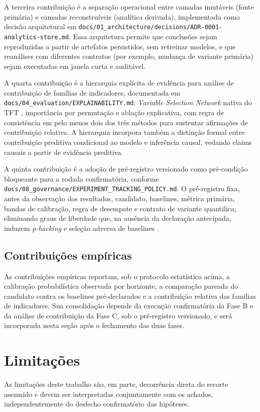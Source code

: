 A terceira contribuição é a separação operacional entre camadas imutáveis (fonte primária) e camadas reconstruíveis (analítica derivada), implementada como decisão arquitetural em \texttt{docs/01\_architecture/decisions/ADR-0001-analytics-store.md}. Essa arquitetura permite que conclusões sejam reproduzidas a partir de artefatos persistidos, sem retreinar modelos, e que reanálises com diferentes contratos (por exemplo, mudança de variante primária) sejam executadas em janela curta e auditável.

A quarta contribuição é a hierarquia explícita de evidência para análise de contribuição de famílias de indicadores, documentada em \texttt{docs/04\_evaluation/EXPLAINABILITY.md}: \textit{Variable Selection Network} nativa do TFT \cite{LIMETAL2021TFT}, importância por permutação e ablação explicativa, com regra de consistência em pelo menos dois dos três métodos para sustentar afirmações de contribuição relativa. A hierarquia incorpora também a distinção formal entre contribuição preditiva condicional ao modelo e inferência causal, vedando claims causais a partir de evidência preditiva.

A quinta contribuição é a adoção de pré-registro versionado como pré-condição bloqueante para a rodada confirmatória, conforme \texttt{docs/08\_governance/EXPERIMENT\_TRACKING\_POLICY.md}. O pré-registro fixa, antes da observação dos resultados, candidato, baselines, métrica primária, bandas de calibração, regra de desempate e contrato de variante quantilica, eliminando graus de liberdade que, na ausência da declaração antecipada, induzem \textit{p-hacking} e seleção adversa de baselines \cite{PINEAU2021REPRODUCIBILITY}.

\subsection{Contribuições empíricas}
As contribuições empíricas reportam, sob o protocolo estatístico acima, a calibração probabilística observada por horizonte, a comparação pareada do candidato contra os baselines pré-declarados e a contribuição relativa das famílias de indicadores. Sua consolidação depende da execução confirmatória da Fase B e da análise de contribuição da Fase C, sob o pré-registro versionado, e será incorporada nesta seção após o fechamento das duas fases.

\section{Limitações}
As limitações deste trabalho são, em parte, decorrência direta do recorte assumido e devem ser interpretadas conjuntamente com os achados, independentemente do desfecho confirmatório das hipóteses.

